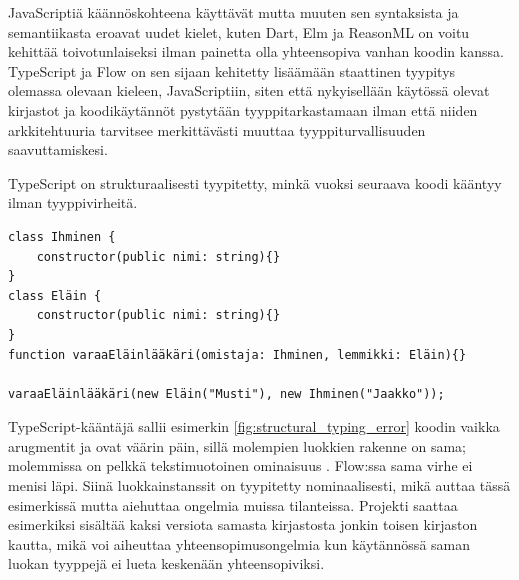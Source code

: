 JavaScriptiä käännöskohteena käyttävät
mutta muuten sen syntaksista ja semantiikasta eroavat uudet kielet,
kuten Dart, Elm ja ReasonML on voitu kehittää toivotunlaiseksi ilman painetta olla
yhteensopiva vanhan koodin kanssa. TypeScript ja Flow on sen sijaan kehitetty
lisäämään staattinen tyypitys olemassa olevaan kieleen, JavaScriptiin,
siten että nykyisellään käytössä olevat kirjastot ja koodikäytännöt pystytään
tyyppitarkastamaan ilman että niiden arkkitehtuuria tarvitsee merkittävästi
muuttaa tyyppiturvallisuuden saavuttamiskesi.

TypeScript on strukturaalisesti tyypitetty, minkä vuoksi seuraava koodi kääntyy
ilman tyyppivirheitä.

\begin{lstlisting}[caption={
  Loogisen virheen sisältävä, mutta ilman virheitä kääntyvä TypeScript-ohjelma.
}, label={fig:structural_typing_error}]
class Ihminen {
    constructor(public nimi: string){}
}
class Eläin {
    constructor(public nimi: string){}
}
function varaaEläinlääkäri(omistaja: Ihminen, lemmikki: Eläin){}

varaaEläinlääkäri(new Eläin("Musti"), new Ihminen("Jaakko"));
\end{lstlisting}
TypeScript-kääntäjä sallii esimerkin \ref{fig:structural_typing_error} koodin
vaikka arugmentit \mbox{} ja \mbox{}
ovat väärin päin, sillä molempien luokkien rakenne on sama; molemmissa on
pelkkä tekstimuotoinen ominaisuus . Flow:ssa sama virhe ei menisi läpi.
Siinä luokkainstanssit on tyypitetty nominaalisesti, mikä auttaa tässä
esimerkissä mutta aiehuttaa ongelmia muissa tilanteissa. Projekti saattaa
esimerkiksi sisältää kaksi versiota samasta kirjastosta jonkin toisen
kirjaston kautta, mikä voi aiheuttaa yhteensopimusongelmia kun käytännössä
saman luokan tyyppejä ei lueta keskenään yhteensopiviksi.